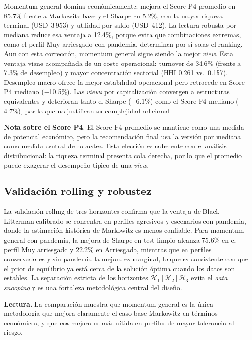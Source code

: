 Momentum general domina econ\'omicamente: mejora el Score P4 promedio en 85.7\%
frente a Markowitz base y el Sharpe en 5.2\%, con la mayor riqueza terminal
(USD~3\,953) y utilidad por saldo (USD~412). La lectura robusta por mediana
reduce esa ventaja a 12.4\%, porque evita que combinaciones extremas, como el
perfil Muy arriesgado con pandemia, determinen por s\'i solas el ranking. Aun
con esta correcci\'on, momentum general sigue siendo la mejor \textit{view}. Esta
ventaja viene acompa\~nada de un costo operacional: turnover de 34.6\% (frente
a 7.3\% de desempleo) y mayor concentraci\'on sectorial (HHI 0.261 vs.\ 0.157).
Desempleo macro ofrece la mejor estabilidad operacional pero retrocede en Score
P4 mediano ($-$10.5\%). Las \textit{views} por capitalizaci\'on convergen a
estructuras equivalentes y deterioran tanto el Sharpe ($-$6.1\%) como el Score
P4 mediano ($-$4.7\%), por lo que no justifican su complejidad adicional.

\medskip
\noindent\textbf{Nota sobre el Score P4.} El Score P4 promedio se mantiene como
una medida de potencial econ\'omico, pero la recomendaci\'on final usa la versi\'on
por mediana como medida central de robustez. Esta elecci\'on es coherente con el
an\'alisis distribucional: la riqueza terminal presenta cola derecha, por lo que
el promedio puede exagerar el desempe\~no t\'ipico de una \textit{view}.

\subsection{Validaci\'on rolling y robustez}

La validaci\'on rolling de tres horizontes confirma que la ventaja de
Black-Litterman calibrado se concentra en perfiles agresivos y escenarios con
pandemia, donde la estimaci\'on hist\'orica de Markowitz es menos confiable. Para
momentum general con pandemia, la mejora de Sharpe en test limpio alcanza 75.6\%
en el perfil Muy arriesgado y 22.2\% en Arriesgado, mientras que en perfiles
conservadores y sin pandemia la mejora es marginal, lo que es consistente con
que el prior de equilibrio ya est\'a cerca de la soluci\'on \'optima cuando los
datos son estables. La separaci\'on estricta de los horizontes
$\mathcal{H}_1\,|\,\mathcal{H}_2\,|\,\mathcal{H}_3$ evita el \textit{data
snooping} y es una fortaleza metodol\'ogica central del dise\~no.

\medskip
\noindent\textbf{Lectura.} La comparaci\'on muestra que momentum general es la
\'unica metodolog\'ia que mejora claramente el caso base Markowitz en t\'erminos
econ\'omicos, y que esa mejora es m\'as n\'itida en perfiles de mayor tolerancia
al riesgo.

